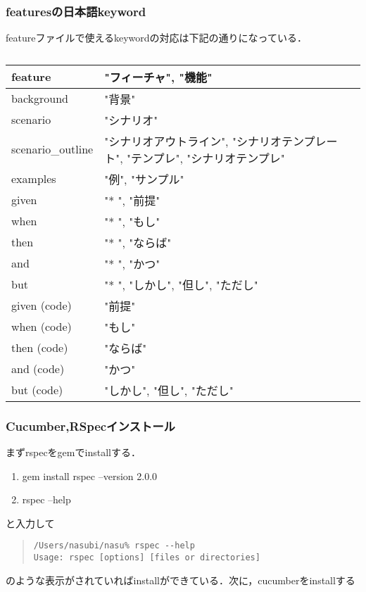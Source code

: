 \subsubsection{featuresの日本語keyword}
featureファイルで使えるkeywordの対応は下記の通りになっている．

\begin{table}[htbp]\begin{center}
\caption{}
\begin{tabular}{lll}
\hline
feature  &"フィーチャ", "機能"     \\ \hline
background  &"背景"              \\
scenario  &"シナリオ"            \\
scenario\_outline   &"シナリオアウトライン", "シナリオテンプレート", "テンプレ", "シナリオテンプレ"   \\
examples  &"例", "サンプル"       \\
given   &"* ", "前提"        \\
when   &"* ", "もし"        \\
then   &"* ", "ならば"       \\
and    &"* ", "かつ"        \\
but    &"* ", "しかし", "但し", "ただし"  \\
given (code)   &"前提"              \\
when (code)   &"もし"              \\
then (code)   &"ならば"             \\
and (code)    &"かつ"              \\
but (code)    &"しかし", "但し", "ただし"   \\
\hline
\end{tabular}
\label{default}
\end{center}\end{table}

\subsubsection{Cucumber,RSpecインストール}
まずrspecをgemでinstallする．

\begin{enumerate}
\item gem install rspec --version 2.0.0
\item rspec --help
\end{enumerate}
と入力して
\begin{quote}\begin{verbatim}
/Users/nasubi/nasu% rspec --help
Usage: rspec [options] [files or directories]
\end{verbatim}\end{quote}
のような表示がされていればinstallができている．次に，cucumberをinstallする

